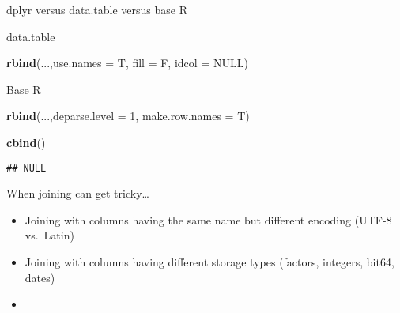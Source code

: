 \documentclass[ignorenonframetext,]{beamer}
\newenvironment{Shaded}{\begin{snugshade}}{\end{snugshade}}
\newcommand{\KeywordTok}[1]{\textcolor[rgb]{0.13,0.29,0.53}{\textbf{#1}}}
\newcommand{\DataTypeTok}[1]{\textcolor[rgb]{0.13,0.29,0.53}{#1}}
\newcommand{\DecValTok}[1]{\textcolor[rgb]{0.00,0.00,0.81}{#1}}
\newcommand{\OtherTok}[1]{\textcolor[rgb]{0.56,0.35,0.01}{#1}}
\newcommand{\NormalTok}[1]{#1}
\begin{document}
\begin{frame}[fragile]{dplyr versus data.table versus base R}

\begin{block}{data.table}

\begin{Shaded}
\begin{Highlighting}[]
\KeywordTok{rbind}\NormalTok{(...,}\DataTypeTok{use.names =}\NormalTok{ T, }\DataTypeTok{fill =}\NormalTok{ F, }\DataTypeTok{idcol =} \OtherTok{NULL}\NormalTok{)}
\end{Highlighting}
\end{Shaded}

\end{block}

\begin{block}{Base R}

\begin{Shaded}
\begin{Highlighting}[]
\KeywordTok{rbind}\NormalTok{(...,}\DataTypeTok{deparse.level =} \DecValTok{1}\NormalTok{, }\DataTypeTok{make.row.names =}\NormalTok{ T)}
\end{Highlighting}
\end{Shaded}

\begin{Shaded}
\begin{Highlighting}[]
\KeywordTok{cbind}\NormalTok{()}
\end{Highlighting}
\end{Shaded}

\begin{verbatim}
## NULL
\end{verbatim}

\end{block}

\end{frame}

\begin{frame}{When joining can get tricky\ldots{}}

\begin{itemize}
\item
  Joining with columns having the same name but different encoding
  (UTF-8 vs.~Latin)
\item
  Joining with columns having different storage types (factors,
  integers, bit64, dates)
\item
\end{itemize}

\end{frame}
\end{document}
